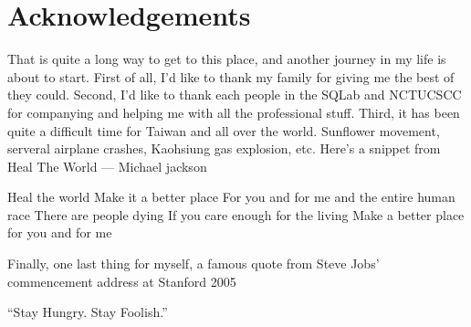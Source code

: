 \chapter{Acknowledgements}

That is quite a long way to get to this place, and another journey in my life
is about to start. First of all, I'd like to thank my family for giving me the
best of they could. Second, I'd like to thank each people in the SQLab and
NCTUCSCC for companying and helping me with all the professional stuff. Third,
it has been quite a difficult time for Taiwan and all over the world. Sunflower
movement, serveral airplane crashes, Kaohsiung gas explosion, etc. Here's a
snippet from Heal The World --- Michael jackson

Heal the world\newline
Make it a better place\newline
For you and for me and the entire human race\newline
There are people dying\newline
If you care enough for the living\newline
Make a better place for you and for me\newline

Finally, one last thing for myself, a famous quote from Steve Jobs' commencement
address at Stanford 2005

``Stay Hungry. Stay Foolish.''
